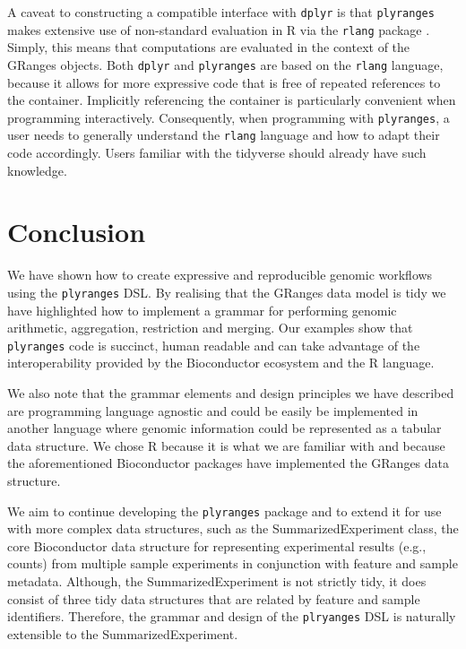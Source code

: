 \documentclass[]{article}
\begin{document}
A caveat to constructing a compatible interface with \texttt{dplyr} is
that \texttt{plyranges} makes extensive use of non-standard evaluation
in R via the \texttt{rlang} package \cite{R-rlang}. Simply, this means
that computations are evaluated in the context of the GRanges objects.
Both \texttt{dplyr} and \texttt{plyranges} are based on the
\texttt{rlang} language, because it allows for more expressive code that
is free of repeated references to the container. Implicitly referencing
the container is particularly convenient when programming interactively.
Consequently, when programming with \texttt{plyranges}, a user needs to
generally understand the \texttt{rlang} language and how to adapt their
code accordingly. Users familiar with the tidyverse should already have
such knowledge.

\hypertarget{conclusion}{%
\section{Conclusion}\label{conclusion}}

We have shown how to create expressive and reproducible genomic
workflows using the \texttt{plyranges} DSL. By realising that the
GRanges data model is tidy we have highlighted how to implement a
grammar for performing genomic arithmetic, aggregation, restriction and
merging. Our examples show that \texttt{plyranges} code is succinct,
human readable and can take advantage of the interoperability provided
by the Bioconductor ecosystem and the R language.

We also note that the grammar elements and design principles we have
described are programming language agnostic and could be easily be
implemented in another language where genomic information could be
represented as a tabular data structure. We chose R because it is what
we are familiar with and because the aforementioned Bioconductor
packages have implemented the GRanges data structure.

We aim to continue developing the \texttt{plyranges} package and to
extend it for use with more complex data structures, such as the
SummarizedExperiment class, the core Bioconductor data structure for
representing experimental results (e.g., counts) from multiple sample
experiments in conjunction with feature and sample metadata. Although,
the SummarizedExperiment is not strictly tidy, it does consist of three
tidy data structures that are related by feature and sample identifiers.
Therefore, the grammar and design of the \texttt{plryanges} DSL is
naturally extensible to the SummarizedExperiment.
\end{document}

